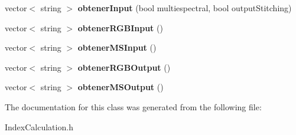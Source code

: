 \begin{DoxyCompactItemize}
\item 
\mbox{\label{classIndexCalculation_a65a88228b2caf575cbbac793a03d1dd6}} 
vector$<$ string $>$ {\bfseries obtener\+Input} (bool multiespectral, bool output\+Stitching)
\item 
\mbox{\label{classIndexCalculation_aacf5294ab87007a511f9f9e9772855af}} 
vector$<$ string $>$ {\bfseries obtener\+R\+G\+B\+Input} ()
\item 
\mbox{\label{classIndexCalculation_a889a95c13bc480c1194016ca0e1e9559}} 
vector$<$ string $>$ {\bfseries obtener\+M\+S\+Input} ()
\item 
\mbox{\label{classIndexCalculation_a23a9f9a23db086109989fb93450a70d7}} 
vector$<$ string $>$ {\bfseries obtener\+R\+G\+B\+Output} ()
\item 
\mbox{\label{classIndexCalculation_a43b986cd58175d47714a399e7fdfd7e3}} 
vector$<$ string $>$ {\bfseries obtener\+M\+S\+Output} ()
\end{DoxyCompactItemize}


The documentation for this class was generated from the following file\+:\begin{DoxyCompactItemize}
\item 
Index\+Calculation.\+h\end{DoxyCompactItemize}
